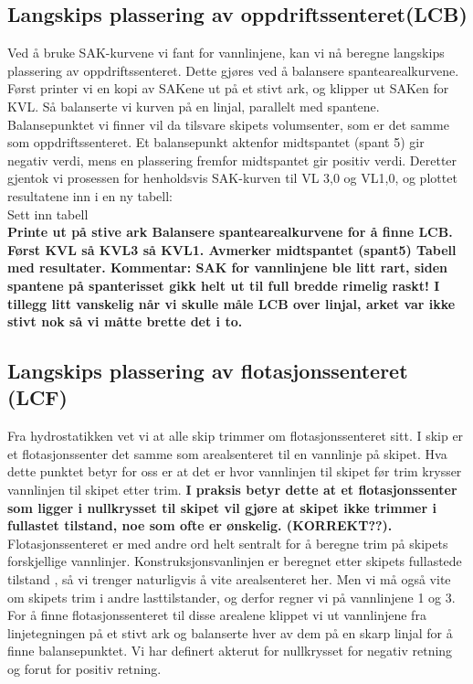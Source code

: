 \documentclass[norsk]{article}
\begin{document}
	\subsection{Langskips plassering av oppdriftssenteret(LCB)}
Ved å bruke SAK-kurvene vi fant for vannlinjene, kan vi nå beregne langskips plassering av oppdriftssenteret. Dette gjøres ved å balansere spantearealkurvene. Først printer vi en kopi av SAKene ut på et stivt ark, og klipper ut SAKen for KVL. Så balanserte vi kurven på en linjal, parallelt med spantene. Balansepunktet vi finner vil da tilsvare skipets volumsenter, som er det samme som oppdriftssenteret. Et balansepunkt aktenfor midtspantet (spant 5) gir negativ verdi, mens en plassering fremfor midtspantet gir positiv verdi. Deretter gjentok vi prosessen for henholdsvis SAK-kurven til VL 3,0 og VL1,0, og plottet resultatene inn i en ny tabell:\\

Sett inn tabell\\

\textbf{Printe ut på stive ark
Balansere spantearealkurvene for å finne LCB. Først KVL så KVL3 så KVL1. Avmerker midtspantet (spant5)
Tabell med resultater. Kommentar: SAK for vannlinjene ble litt rart, siden spantene på spanterisset gikk helt ut til full bredde rimelig raskt! I tillegg litt vanskelig når vi skulle måle LCB over linjal, arket var ikke stivt nok så vi måtte brette det i to.}

   
 	\subsection{Langskips plassering av flotasjonssenteret (LCF)}
Fra hydrostatikken vet vi at alle skip trimmer om flotasjonssenteret sitt. I skip er et flotasjonssenter det samme som arealsenteret til en vannlinje på skipet. Hva dette punktet betyr for oss er at det er hvor vannlinjen til skipet før trim krysser vannlinjen til skipet etter trim. \textbf{I praksis betyr dette at et flotasjonssenter som ligger i nullkrysset til skipet vil gjøre at skipet ikke trimmer i fullastet tilstand, noe som ofte er ønskelig. (KORREKT??).} Flotasjonssenteret er med andre ord helt sentralt for å beregne trim på skipets forskjellige vannlinjer. Konstruksjonsvanlinjen er beregnet etter skipets fullastede tilstand , så vi trenger naturligvis å vite arealsenteret her. Men vi må også vite om skipets trim i andre lasttilstander, og derfor regner vi på vannlinjene 1 og 3. For å finne flotasjonssenteret til disse arealene klippet vi ut vannlinjene fra linjetegningen på et stivt ark og balanserte hver av dem på en skarp linjal for å finne balansepunktet. Vi har definert akterut for nullkrysset for negativ retning og forut for positiv retning. \\
\end{document}
